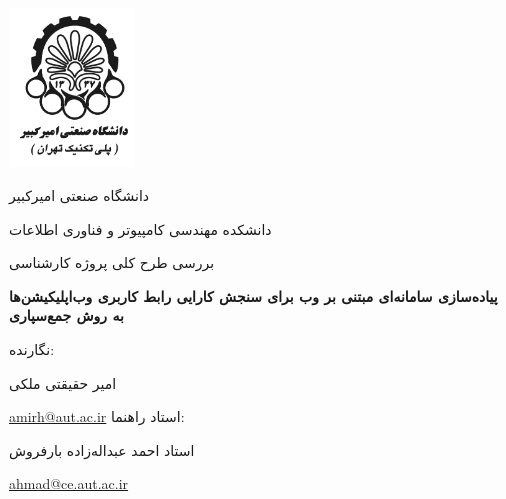 		\centering
		\includegraphics[width=0.25\textwidth]{Resources/logo.png}\par\vspace{1cm}
		{\scshape\LARGE دانشگاه صنعتی امیرکبیر \par}
		{\scshape\LARGE دانشکده مهندسی کامپیوتر و فناوری اطلاعات \par}
		\vspace{1cm}
		{\scshape\Large
			بررسی طرح کلی پروژه کارشناسی
			\par}
		\vspace{1.5cm}
		{\huge\bfseries 
			پیاده‌سازی سامانه‌ای مبتنی بر وب برای سنجش کارایی رابط کاربری وب‌اپلیکیشن‌ها به روش جمع‌سپاری
			\par}
		\vspace{2cm}
		نگارنده:\par
		{\Large امیر حقیقتی ملکی\par}
		\href{mailto:amirh@aut.ac.ir}{amirh@aut.ac.ir}
		\vfill
		استاد راهنما:\par
		{\Large استاد احمد عبداله‌زاده بارفروش\par}
		\href{mailto:ahmad@ce.aut.ac.ir}{ahmad@ce.aut.ac.ir}
		\vfill
		
		{\large {}\par}